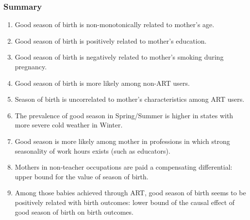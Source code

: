 \documentclass[10pt,letterpaper,subeqn]{beamer}
\begin{document}
\begin{frame}[label=conclusions]
\frametitle{Summary}
\begin{enumerate}
\item Good season of birth is non-monotonically related to mother's age.
\item Good season of birth is positively related to mother's education.
\item Good season of birth is negatively related to mother's smoking during pregnancy.
\item Good season of birth is more likely among non-ART users.
\item Season of birth is uncorrelated to mother's characteristics among ART users.
\item The prevalence of good season in Spring/Summer is higher in states with more severe cold weather in Winter.
\item Good season is more likely among mother in professions in which strong seasonality of work hours exists (such as educators).
\item Mothers in non-teacher occupations are paid a compensating differential: upper bound for the value of season of birth.
\item Among those babies achieved through ART, good season of birth seems to be positively related with birth outcomes: lower bound of the causal effect of good season of birth on birth outcomes.
\end{enumerate}
\end{frame}
\end{document}
